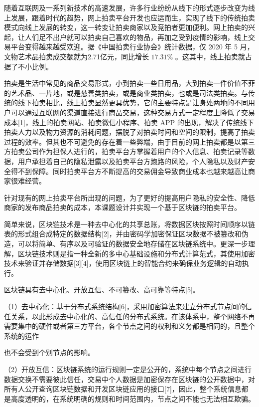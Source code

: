 \documentclass[
  10
]{article}
\begin{document}
随着互联网及一系列新技术的高速发展，许多行业纷纷从线下的形式逐步改变为线上发展，跟着时代的趋势，网上拍卖平台开发也应运而生，实现了线下的传统拍卖模式向线上发展的转变，这一转变让拍卖商家以及竞拍者更加便利。网上拍卖的兴起，让人们足不出户就可以拍卖自己喜欢的物品，再加之受到疫情的影响，线上交易平台变得越来越受欢迎。据《中国拍卖行业协会》统计数据，仅
2020 年 5 月，文物艺术品拍卖成交额就为2.71亿元，同比增长
\(1 7 . 3 1 \%\) 。这其中，线上拍卖就占据了不小比例。

拍卖是生活中常见的商品交易形式，小到拍卖一些日用品，大到拍卖一件价值不菲的艺术品、一片地，或是慈善类拍卖，或是商业类拍卖，也或是司法类拍卖。与传统的线下拍卖相比，线上拍卖显然更具优势，它的主要特点是让身处两地的不同用户可以通过互联网的渠道直接进行商品交易，这种交易方式一定程度上降低了交易成本{[}1{]}，线上的拍卖网站、拍卖微信小程序、拍卖
APP
的出现，解决了传统线下拍卖人力以及物力资源的消耗问题，摆脱了对拍卖时间和空间的限制，提高了拍卖过程的效率。但其也不可避免的存在着一些弊端，由于目前的网上拍卖都是以第三方拍卖公司作为担保人进行的，拍卖平台方掌握着用户的个人信息、拍卖记录等数据，用户承担着自己的隐私泄露以及拍卖平台方跑路的风险，个人隐私以及财产安全得不到保障。同时拍卖平台方不断提高的交易佣金导致商业成本也越来越高让商家很难经营。

针对现有的网上拍卖平台所出现的问题，为了更好的提高用户隐私的安全性、降低商家的发布商品拍卖的成本，本课题设计并实现一个基于区块链的拍卖平台。

简单来说，区块链技术是一种去中心化的共享总账，将数据区块按照时间顺序以链表的形式组合成特定的数据结构{[}2{]}，并由密码学加密保证区块数据不被篡改和伪造，可以将简单、有序以及可验证的数据安全地存储在区块链系统中。更深一步理解，区块链技术则是指一种全新的多中心基础设施和分布式计算范式，其使用加密技术来验证并存储数据{[}3{]}{[}4{]}，使用区块链上的智能合约来确保业务逻辑的自动执行。

区块链具有去中心化、开放互信、不可篡改、高可靠等特点{[}5{]}。

（1）去中心化：基于分布式系统结构{[}6{]}，采用加密算法来建立分布式节点间的信任关系，以此形成去中心化的、高信任的分布式系统。在该体系中，整个网络不再需要集中的硬件或者第三方平台，各个节点之间的权利和义务都是相同的，且整个系统的运作

也不会受到个别节点的影响。

（2）开放互信：区块链系统的运行规则一定是公开的，系统中每个节点之间进行数据交换不需要彼此信任，交易中个人数据是加密保存在区块链的公开数据中，对所有人公开查询区块链数据和开发区块链应用的接口{[}7{]}，因此，整个系统信息都是高度透明的，在系统明确的规则和时间范围内，节点之间不能也无法相互欺骗。
\end{document}

